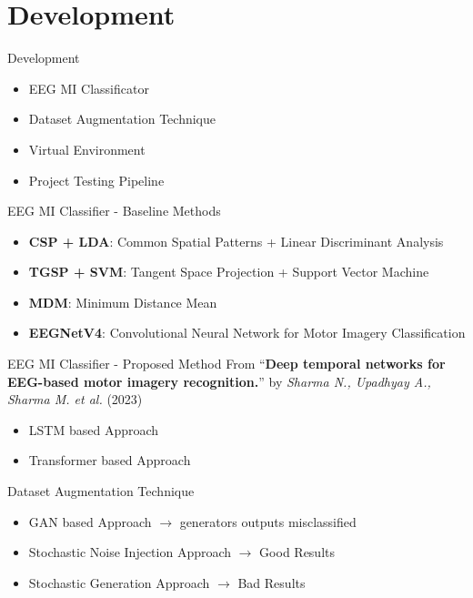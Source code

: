 \section{Development}
\begin{frame}{Development}
\begin{itemize}
    \item EEG MI Classificator
    \item Dataset Augmentation Technique
    \item Virtual Environment
    \item Project Testing Pipeline
\end{itemize}
\end{frame}

\begin{frame}{EEG MI Classifier - Baseline Methods}
\begin{itemize}
    \item \textbf{CSP + LDA}: Common Spatial Patterns + Linear Discriminant Analysis
    \item \textbf{TGSP + SVM}: Tangent Space Projection + Support Vector Machine
    \item \textbf{MDM}: Minimum Distance Mean
    \item \textbf{EEGNetV4}: Convolutional Neural Network for Motor Imagery Classification
\end{itemize}
\end{frame}

\begin{frame}{EEG MI Classifier - Proposed Method}
    From ``\textbf{Deep temporal networks for EEG-based motor imagery recognition.}'' by \textit{Sharma N., Upadhyay A., Sharma M. et al.} (2023)
    \begin{itemize}
        \item LSTM based Approach
        \item Transformer based Approach
    \end{itemize}
\end{frame}

\begin{frame}{Dataset Augmentation Technique}
    \begin{itemize}
        \item GAN based Approach $\rightarrow{}$ generators outputs misclassified
        \item Stochastic Noise Injection Approach $\rightarrow{}$ Good Results
        \item Stochastic Generation Approach $\rightarrow{}$ Bad Results
    \end{itemize}
\end{frame}

